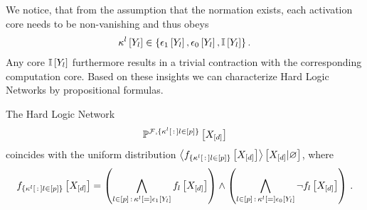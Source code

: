 We notice, that from the assumption that the normation exists, each activation core needs to be non-vanishing and thus obeys
\begin{align*}
	\kappa^{l}\left[Y_{l}\right]\in\{\epsilon_1\left[Y_{l}\right],\epsilon_0\left[Y_{l}\right],\mathbb{I}\left[Y_{l}\right]\}	\, .
\end{align*}
Any core $\mathbb{I}\left[Y_{l}\right]$ furthermore results in a trivial contraction with the corresponding computation core.
Based on these insights we can characterize Hard Logic Networks by propositional formulas.

\begin{theorem}
	The Hard Logic Network
	\begin{align*}
		\mathbb{P}^{\mathcal{F},\{\kappa^{l}\left[\,:\,\right]l\in[p]\}}\left[X_{[d]}\right]
	\end{align*}
	coincides with the uniform distribution $\left\langle f_{\{\kappa^{l}\left[\,:\,\right]l\in[p]\}}\left[X_{[d]}\right]\right\rangle \left[ X_{[d]} | \varnothing \right]$, where
	\begin{align*}
		f_{\{\kappa^{l}\left[\,:\,\right]l\in[p]\}}\left[X_{[d]}\right] =
		\left(\bigwedge_{l\in[p]\,:\,\kappa^{l}\left[=\right]\epsilon_1\left[Y_{l}\right]} f_{l}\left[X_{[d]}\right]\right)
		\land
		\left(\bigwedge_{l\in[p]\,:\,\kappa^{l}\left[=\right]\epsilon_0\left[Y_{l}\right]} \lnot f_{l}\left[X_{[d]}\right]\right) \, .
	\end{align*}
\end{theorem}
